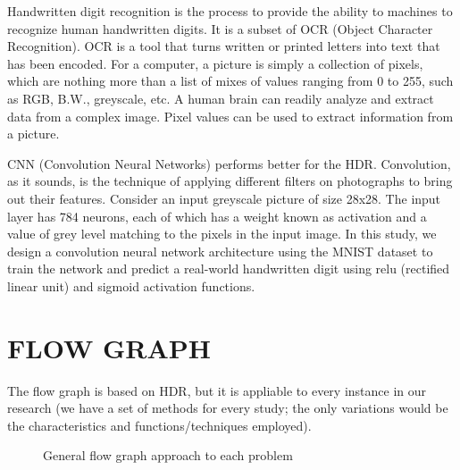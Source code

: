 \documentclass[letterpaper, 10 pt, conference]{ieeeconf}  %
\begin{document}
Handwritten digit recognition is the process to provide the ability to machines to recognize human handwritten digits. It is a subset of OCR (Object Character Recognition). OCR is a tool that turns written or printed letters into text that has been encoded. For a computer, a picture is simply a collection of pixels, which are nothing more than a list of mixes of values ranging from 0 to 255, such as RGB, B.W., greyscale, etc. A human brain can readily analyze and extract data from a complex image. Pixel values can be used to extract information from a picture. \par
CNN (Convolution Neural Networks) performs better for the HDR. Convolution, as it sounds, is the technique of applying different filters on photographs to bring out their features. Consider an input greyscale picture of size 28x28. The input layer has 784 neurons, each of which has a weight known as activation and a value of grey level matching to the pixels in the input image. In this study, we design a convolution neural network architecture using the MNIST dataset to train the network and predict a real-world handwritten digit using relu (rectified linear unit) and sigmoid activation functions. \par

\section{FLOW GRAPH}

The flow graph is based on HDR, but it is appliable to every instance in our research (we have a set of methods for every study; the only variations would be the characteristics and functions/techniques employed).

\begin{figure}[thpb]
      \centering
      \caption{General flow graph approach to each problem}
      \label{fig:1}
\end{figure}
\end{document}

